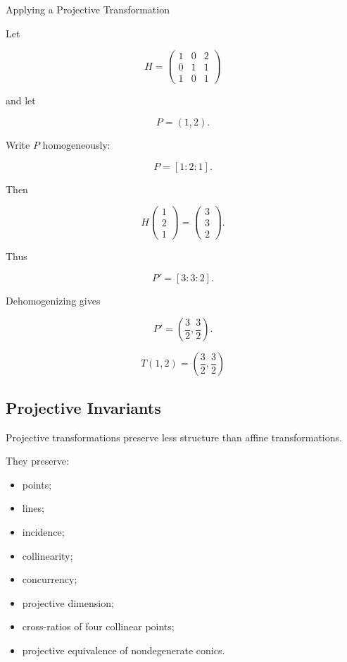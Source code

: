 \begin{workedexamplebox}{Applying a Projective Transformation}

Let

\[
H=
\begin{pmatrix}
1&0&2\\
0&1&1\\
1&0&1
\end{pmatrix}
\]

and let

\[
P=(1,2).
\]

Write \(P\) homogeneously:

\[
P=[1:2:1].
\]

Then

\[
H
\begin{pmatrix}
1\\2\\1
\end{pmatrix}
=
\begin{pmatrix}
3\\3\\2
\end{pmatrix}.
\]

Thus

\[
P'=[3:3:2].
\]

Dehomogenizing gives

\[
P'=
\left(
\frac32,
\frac32
\right).
\]

\begin{answerbox}
\[
\boxed{
T(1,2)=
\left(\frac32,\frac32\right)
}
\]
\end{answerbox}
\end{workedexamplebox}

\subsection{Projective Invariants}
\label{subsec:projective-invariants}

Projective transformations preserve less structure than affine
transformations.

They preserve:

\begin{itemize}
    \item points;
    \item lines;
    \item incidence;
    \item collinearity;
    \item concurrency;
    \item projective dimension;
    \item cross-ratios of four collinear points;
    \item projective equivalence of nondegenerate conics.
\end{itemize}

